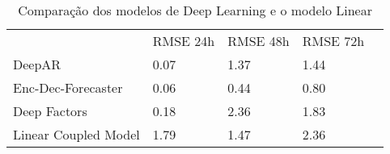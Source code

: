 \begin{center}
  \begin{table}[htbp]
    \caption{Comparação dos modelos de Deep Learning e o modelo Linear}
    \centering
  \begin{tabular}{l|llll}
    \cline{2-4}
    & \multicolumn{1}{l|}{RMSE 24h} & \multicolumn{1}{l|}{RMSE 48h} & \multicolumn{1}{l|}{RMSE 72h} &  \\ \cline{1-4}
    \multicolumn{1}{|l|}{DeepAR}               &               0.07                &          1.37                     &           1.44                    &  \\ \cline{1-1}
    \multicolumn{1}{|l|}{Enc-Dec-Forecaster}   &                   0.06            &        0.44                       &       0.80                        &  \\ \cline{1-1}
    \multicolumn{1}{|l|}{Deep Factors}         &              0.18                 &           2.36                    &                   1.83            &  \\ \cline{1-1}
    \multicolumn{1}{|l|}{Linear Coupled Model} &                  1.79             &       1.47                        &     2.36                          &  \\ \cline{1-1}
  \end{tabular}
  \end{table}
\end{center}
